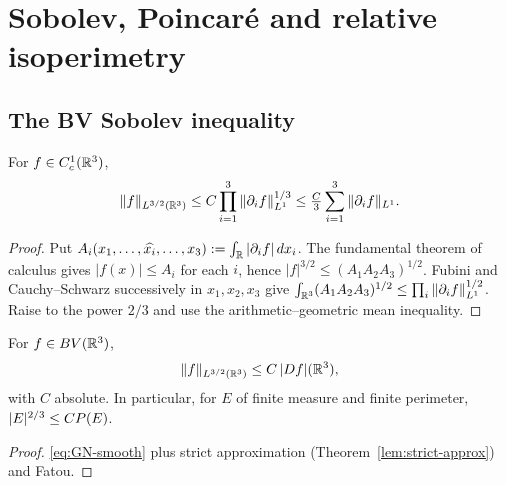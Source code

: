 \chapter{Sobolev, Poincar\'e and relative isoperimetry}\label{ch:sobolev}

\section{The BV Sobolev inequality}

\begin{lemma}\label{lem:GN-smooth}
For $f\in C^1_c(\mathbb R^3)$,
\begin{equation}\label{eq:GN-smooth}
  \|f\|_{L^{3/2}(\mathbb R^3)}\le C\prod_{i=1}^3\|\partial_if\|_{L^1}^{1/3}
  \le \tfrac{C}{3}\sum_{i=1}^3\|\partial_if\|_{L^1}.
\end{equation}
\end{lemma}

\begin{proof}
Put $A_i(x_1,\dots,\widehat{x_i},\dots,x_3):=\int_\mathbb R|\partial_if|\,dx_i$.  The
fundamental theorem of calculus gives $|f(x)|\le A_i$ for each $i$, hence
$|f|^{3/2}\le(A_1A_2A_3)^{1/2}$.  Fubini and Cauchy--Schwarz successively in
$x_1,x_2,x_3$ give
$\int_{\mathbb R^3}(A_1A_2A_3)^{1/2}\le\prod_i\|\partial_if\|_{L^1}^{1/2}$.  Raise to
the power $2/3$ and use the arithmetic--geometric mean inequality.
\end{proof}

\begin{theorem}\label{thm:bv-sobolev}
For $f\in BV(\mathbb R^3)$,
\begin{equation}\label{eq:bv-sobolev}
  \|f\|_{L^{3/2}(\mathbb R^3)}\le C\,|Df|(\mathbb R^3),
\end{equation}
with $C$ absolute.  In particular, for $E$ of finite measure and finite
perimeter, $|E|^{2/3}\le CP(E)$.
\end{theorem}

\begin{proof}
\eqref{eq:GN-smooth} plus strict approximation
(Theorem~\ref{lem:strict-approx}) and Fatou.
\end{proof}

